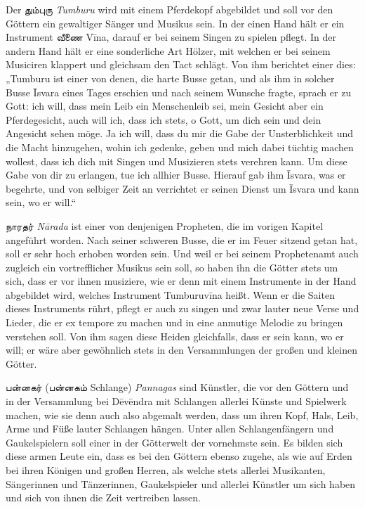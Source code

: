 \documentclass{article}
\newcommand{\TamilText}[1]{\texttamil{#1}}
\newcommand{\tam}[1]{\TamilText{#1}}
\begin{document}
Der \tam{தும்புரு} \emph{Tumburu} wird mit einem Pferdekopf abgebildet und soll vor den Göttern ein gewaltiger Sänger und Musikus sein. In der einen Hand hält er ein Instrument \tam{வீணை} V\={i}na, darauf er bei seinem Singen zu spielen pflegt. In der andern Hand hält er eine sonderliche Art Hölzer, mit welchen er bei seinem Musiciren klappert und gleichsam den Tact schlägt. Von ihm berichtet einer dies: „Tumburu ist einer von denen, die harte Busse getan, und als ihm in solcher Busse \={I}svara eines Tages erschien und nach seinem Wunsche fragte, sprach er zu Gott: ich will, dass mein Leib ein Menschenleib sei, mein Gesicht aber ein Pferdegesicht, auch will ich, dass ich stets, o Gott, um dich sein und dein Angesicht sehen möge. Ja ich will, dass du mir die Gabe der Unsterblichkeit und die Macht hinzugehen, wohin ich gedenke, geben und mich dabei tüchtig machen wollest, dass ich dich mit Singen und Musizieren stets verehren kann. Um diese Gabe von dir zu erlangen, tue ich allhier Busse. Hierauf gab ihm \={I}svara, was er begehrte, und von selbiger Zeit an verrichtet er seinen Dienst um \={I}svara und kann sein, wo er will.“

\tam{நாரதர்} \emph{N\={a}rada} ist einer von denjenigen Propheten, die im vorigen Kapitel angeführt worden. Nach seiner schweren Busse, die er im Feuer sitzend getan hat, soll er sehr hoch erhoben worden sein. Und weil er bei seinem Prophetenamt auch zugleich ein vortrefflicher Musikus sein soll, so haben ihn die Götter stets um sich, dass er vor ihnen musiziere, wie er denn mit einem Instrumente in der Hand abgebildet wird, welches Instrument Tumburuv\={i}na heißt. Wenn er die Saiten dieses Instruments rührt, pflegt er auch zu singen und zwar lauter neue Verse und Lieder, die er ex tempore zu machen und in eine anmutige Melodie zu bringen verstehen soll. Von ihm sagen diese Heiden gleichfalls, dass er sein kann, wo er will; er wäre aber gewöhnlich stets in den Versammlungen der großen und kleinen Götter.

\tam{பன்னகர்} (\tam{பன்னகம்} Schlange) \emph{Pannagas} sind Künstler, die vor den Göttern und in der Versammlung bei D\={e}v\={e}ndra mit Schlangen allerlei Künste und Spielwerk machen, wie sie denn auch also abgemalt werden, dass um ihren Kopf, Hals, Leib, Arme und Füße lauter Schlangen hängen. Unter allen Schlangenfängern und Gaukelspielern soll einer in der Götterwelt der vornehmste sein. Es bilden sich diese armen Leute ein, dass es bei den Göttern ebenso zugehe, als wie auf Erden bei ihren Königen und großen Herren, als welche stets allerlei Musikanten, Sängerinnen und Tänzerinnen, Gaukelspieler und allerlei Künstler um sich haben und sich von ihnen die Zeit vertreiben lassen.
\end{document}
